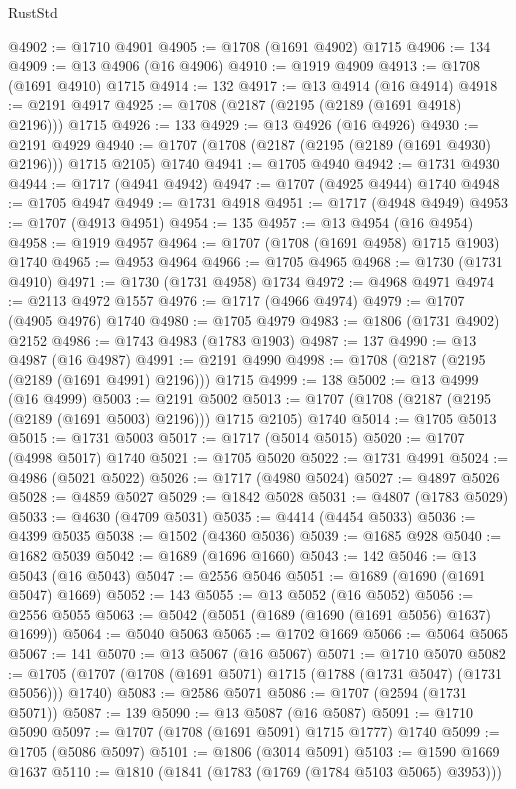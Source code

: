 \begin{lexlean}{RustStd}
\begin{coremodule}
@4902 := @1710 @4901
@4905 := @1708 (@1691 @4902) @1715
@4906 := 134
@4909 := @13 @4906 (@16 @4906)
@4910 := @1919 @4909
@4913 := @1708 (@1691 @4910) @1715
@4914 := 132
@4917 := @13 @4914 (@16 @4914)
@4918 := @2191 @4917
@4925 := @1708 (@2187 (@2195 (@2189 (@1691 @4918) @2196))) @1715
@4926 := 133
@4929 := @13 @4926 (@16 @4926)
@4930 := @2191 @4929
@4940 := @1707 (@1708 (@2187 (@2195 (@2189 (@1691 @4930) @2196))) @1715 @2105) @1740
@4941 := @1705 @4940
@4942 := @1731 @4930
@4944 := @1717 (@4941 @4942)
@4947 := @1707 (@4925 @4944) @1740
@4948 := @1705 @4947
@4949 := @1731 @4918
@4951 := @1717 (@4948 @4949)
@4953 := @1707 (@4913 @4951)
@4954 := 135
@4957 := @13 @4954 (@16 @4954)
@4958 := @1919 @4957
@4964 := @1707 (@1708 (@1691 @4958) @1715 @1903) @1740
@4965 := @4953 @4964
@4966 := @1705 @4965
@4968 := @1730 (@1731 @4910)
@4971 := @1730 (@1731 @4958) @1734
@4972 := @4968 @4971
@4974 := @2113 @4972 @1557
@4976 := @1717 (@4966 @4974)
@4979 := @1707 (@4905 @4976) @1740
@4980 := @1705 @4979
@4983 := @1806 (@1731 @4902) @2152
@4986 := @1743 @4983 (@1783 @1903)
@4987 := 137
@4990 := @13 @4987 (@16 @4987)
@4991 := @2191 @4990
@4998 := @1708 (@2187 (@2195 (@2189 (@1691 @4991) @2196))) @1715
@4999 := 138
@5002 := @13 @4999 (@16 @4999)
@5003 := @2191 @5002
@5013 := @1707 (@1708 (@2187 (@2195 (@2189 (@1691 @5003) @2196))) @1715 @2105) @1740
@5014 := @1705 @5013
@5015 := @1731 @5003
@5017 := @1717 (@5014 @5015)
@5020 := @1707 (@4998 @5017) @1740
@5021 := @1705 @5020
@5022 := @1731 @4991
@5024 := @4986 (@5021 @5022)
@5026 := @1717 (@4980 @5024)
@5027 := @4897 @5026
@5028 := @4859 @5027
@5029 := @1842 @5028
@5031 := @4807 (@1783 @5029)
@5033 := @4630 (@4709 @5031)
@5035 := @4414 (@4454 @5033)
@5036 := @4399 @5035
@5038 := @1502 (@4360 @5036)
@5039 := @1685 @928
@5040 := @1682 @5039
@5042 := @1689 (@1696 @1660)
@5043 := 142
@5046 := @13 @5043 (@16 @5043)
@5047 := @2556 @5046
@5051 := @1689 (@1690 (@1691 @5047) @1669)
@5052 := 143
@5055 := @13 @5052 (@16 @5052)
@5056 := @2556 @5055
@5063 := @5042 (@5051 (@1689 (@1690 (@1691 @5056) @1637) @1699))
@5064 := @5040 @5063
@5065 := @1702 @1669
@5066 := @5064 @5065
@5067 := 141
@5070 := @13 @5067 (@16 @5067)
@5071 := @1710 @5070
@5082 := @1705 (@1707 (@1708 (@1691 @5071) @1715 (@1788 (@1731 @5047) (@1731 @5056))) @1740)
@5083 := @2586 @5071
@5086 := @1707 (@2594 (@1731 @5071))
@5087 := 139
@5090 := @13 @5087 (@16 @5087)
@5091 := @1710 @5090
@5097 := @1707 (@1708 (@1691 @5091) @1715 @1777) @1740
@5099 := @1705 (@5086 @5097)
@5101 := @1806 (@3014 @5091)
@5103 := @1590 @1669 @1637
@5110 := @1810 (@1841 (@1783 (@1769 (@1784 @5103 @5065) @3953)))

\end{coremodule}
\end{lexlean}
